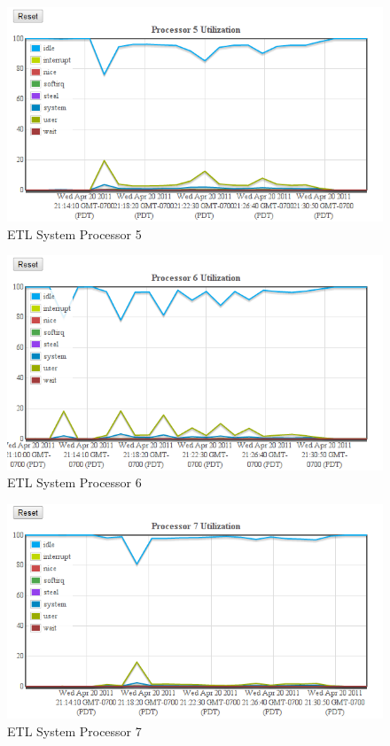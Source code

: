 \documentclass[twocolumn,letterpaper]{article}
\begin{document}
\begin{figure}[ht]
  \begin{center}
    \includegraphics[scale=0.37]{etl-c10-cpu-05}
  \end{center}
  \caption{ETL System Processor 5}
\end{figure}

\begin{figure}[ht]
  \begin{center}
    \includegraphics[scale=0.37]{etl-c10-cpu-06}
  \end{center}
  \caption{ETL System Processor 6}
\end{figure}

\begin{figure}[ht]
  \begin{center}
    \includegraphics[scale=0.37]{etl-c10-cpu-07}
  \end{center}
  \caption{ETL System Processor 7}
  \label{etl-c10-cpu07}
\end{figure}
\end{document}
